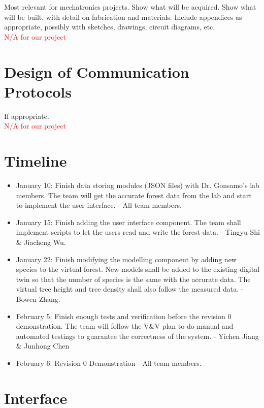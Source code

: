 \documentclass[12pt, titlepage]{article}
\begin{document}
Most relevant for mechatronics projects. Show what will be acquired. Show what will be built, with detail on fabrication and materials. Include appendices as appropriate, possibly with sketches, drawings, circuit diagrams, etc. \\ \textcolor{red}{N/A for our project}

\section{Design of Communication Protocols}

If appropriate. \\ \textcolor{red}{N/A for our project}

\newpage

\section{Timeline}
\begin{itemize}
    \item January 10: Finish data storing modules (JSON files) with Dr. Gonsamo's lab members. The team will get the accurate forest data from the lab and start to implement the user interface. - All team members.
    \item January 15: Finish adding the user interface component. The team shall implement scripts to let the users read and write the forest data. - Tingyu Shi \& Jiacheng Wu.
    \item January 22: Finish modifying the modelling component by adding new species to the virtual forest. New models shall be added to the existing digital twin so that the number of species is the same with the accurate data. The virtual tree height and tree density shall also follow the measured data. - Bowen Zhang.
    \item February 5: Finish enough tests and verification before the revision 0 demonstration. The team will follow the V\&V plan to do manual and automated testings to guarantee the correctness of the system. - Yichen Jiang \& Junhong Chen
    \item February 6: Revision 0 Demonstration - All team members.
\end{itemize}


\newpage

\appendix

\section{Interface}
\end{document}
